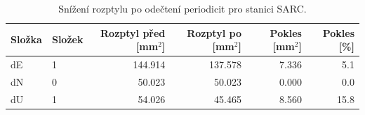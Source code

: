 \begin{table}[H]
\centering
\small
\caption{Snížení rozptylu po odečtení periodicit pro stanici SARC.}
\label{tab:gop25wd04_stcd_sarc_detr_weighted_multiseg_spectral_lomb_scargle_variance_reduction}
\begin{tabular}{llrrrr}
\toprule
Složka & Složek & Rozptyl před [mm$^2$] & Rozptyl po [mm$^2$] & Pokles [mm$^2$] & Pokles [\%] \\
\midrule
dE & 1 & 144.914 & 137.578 & 7.336 & 5.1 \\
dN & 0 & 50.023 & 50.023 & 0.000 & 0.0 \\
dU & 1 & 54.026 & 45.465 & 8.560 & 15.8 \\
\bottomrule
\end{tabular}
\end{table}
